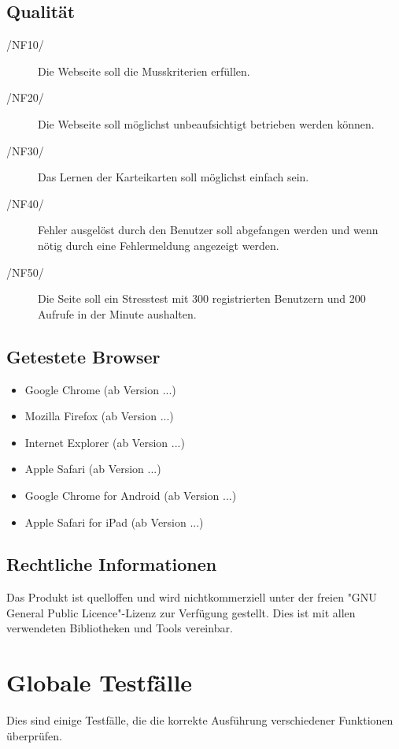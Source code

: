 \subsection{Qualität}
\begin{description}
     \item[/NF10/] Die Webseite soll die Musskriterien erfüllen.
     \item[/NF20/] Die Webseite soll möglichst unbeaufsichtigt betrieben werden können.
     \item[/NF30/] Das Lernen der Karteikarten soll möglichst einfach sein.
     \item[/NF40/] Fehler ausgelöst durch den Benutzer soll abgefangen werden und wenn nötig durch eine Fehlermeldung angezeigt werden.
     \item[/NF50/] Die Seite soll ein Stresstest mit 300 registrierten Benutzern und 200 Aufrufe in der Minute aushalten.
\end{description}

\subsection{Getestete Browser}
\begin{itemize}
	\item Google Chrome (ab Version ...)
	\item Mozilla Firefox (ab Version ...)
	\item Internet Explorer (ab Version ...)
	\item Apple Safari (ab Version ...)
	\item Google Chrome for Android (ab Version ...)
	\item Apple Safari for iPad (ab Version ...)
\end{itemize}

\subsection{Rechtliche Informationen}
Das Produkt ist quelloffen und wird nichtkommerziell unter der freien "GNU General Public Licence"-Lizenz zur Verfügung gestellt. Dies ist mit allen verwendeten Bibliotheken und Tools vereinbar.

\section{Globale Testfälle}
Dies sind einige Testfälle, die die korrekte Ausführung verschiedener Funktionen überprüfen.


